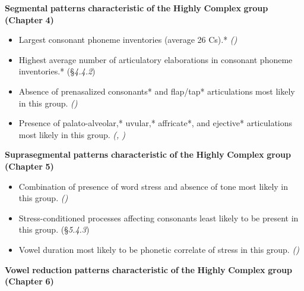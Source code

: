 \textbf{Segmental} \textbf{patterns} \textbf{characteristic} \textbf{of} \textbf{the} \textbf{Highly} \textbf{Complex} \textbf{group} \textbf{(Chapter} \textbf{4)}

\begin{itemize}
\item 
Largest consonant phoneme inventories (average 26 Cs).* \textit{()}

\item 
Highest average number of articulatory elaborations in consonant phoneme inventories.* (§\textit{4.4.2})

\item 
Absence of prenasalized consonants* and flap/tap* articulations most likely in this group. \textit{()}

\item 
Presence of palato-alveolar,* uvular,* affricate*, and ejective* articulations most likely in this group. \textit{(, )}

\end{itemize}

\textbf{Suprasegmental} \textbf{patterns} \textbf{characteristic} \textbf{of} \textbf{the} \textbf{Highly} \textbf{Complex} \textbf{group} \textbf{(Chapter} \textbf{5)}

\begin{itemize}
\item 
Combination of presence of word stress and absence of tone most likely in this group. \textit{()}

\item 
Stress-conditioned processes affecting consonants least likely to be present in this group. (§\textit{5.4.3})

\item 
Vowel duration most likely to be phonetic correlate of stress in this group. \textit{()}

\end{itemize}

\textbf{Vowel} \textbf{reduction} \textbf{patterns} \textbf{characteristic} \textbf{of} \textbf{the} \textbf{Highly} \textbf{Complex} \textbf{group} \textbf{(Chapter} \textbf{6)}

